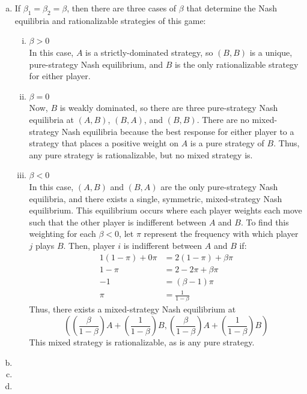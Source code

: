 \documentclass{article}
\begin{document}
\begin{enumerate}[(a)]
	\item If $\beta_1=\beta_2=\beta$, then there are three cases of $\beta$ that determine the Nash equilibria and rationalizable strategies of this game:
		\begin{enumerate}[(i)]
			\item ${\beta>0}$ \\
				In this case, $A$ is a strictly-dominated strategy, so $(B,B)$ is a unique, pure-strategy Nash equilibrium, and $B$ is the only rationalizable strategy for either player.
				
			\item ${\beta=0}$ \\
				Now, $B$ is weakly dominated, so there are three pure-strategy Nash equilibria at $(A,B)$, $(B,A)$, and $(B,B)$. There are no mixed-strategy Nash equilibria because the best response for either player to a strategy that places a positive weight on $A$ is a pure strategy of $B$. Thus, any pure strategy is rationalizable, but no mixed strategy is.
			
			\item ${\beta<0}$ \\
				In this case, $(A,B)$ and $(B,A)$ are the only pure-strategy Nash equilibria, and there exists a single, symmetric, mixed-strategy Nash equilibrium. This equilibrium occurs where each player weights each move such that the other player is indifferent between $A$ and $B$. To find this weighting for each ${\beta<0}$, let $\pi$ represent the frequency with which player $j$ plays $B$. Then, player $i$ is indifferent between $A$ and $B$ if:
					\begin{align*}
						1(1-\pi) + 0\pi &= 2(1-\pi) + \beta\pi	\\
						1 - \pi &= 2 - 2\pi + \beta\pi 	\\
						-1 &= (\beta-1)\pi 	\\
						\pi &= \frac{1}{1-\beta}
					\end{align*}
				Thus, there exists a mixed-strategy Nash equilibrium at 
				\[
					\left(\left(\frac{\beta}{1-\beta}\right)A + \left(\frac{1}{1-\beta}\right)B,\left(\frac{\beta}{1-\beta}\right)A+\left(\frac{1}{1-\beta}\right)B\right)
				\]
				This mixed strategy is rationalizable, as is any pure strategy.
			
		\end{enumerate}
	
	
	\item 
	
	
	\item 
	
	
	\item 
	
	
\end{enumerate}
\end{document}
